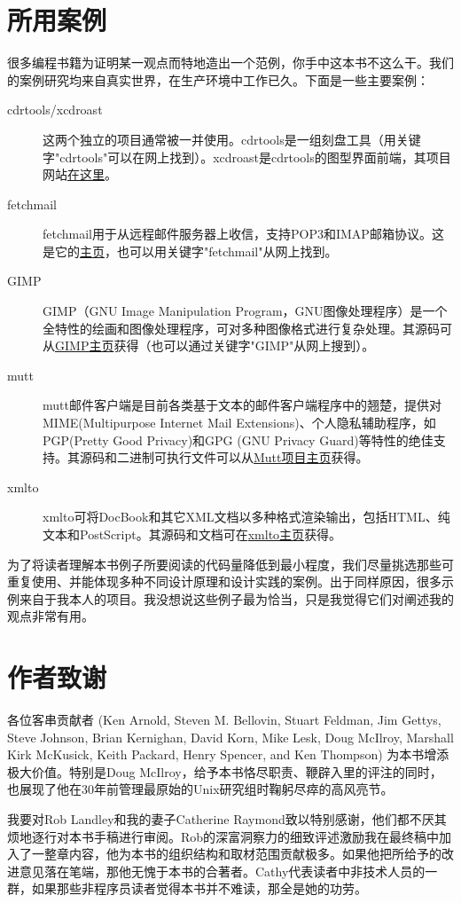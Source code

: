 \documentclass[12pt,oneside]{book}
\begin{document}
\section{所用案例}
很多编程书籍为证明某一观点而特地造出一个范例，你手中这本书不这么干。我们的案例研究均来自真实世界，在生产环境中工作已久。下面是一些主要案例：
\begin{description}
\item[cdrtools/xcdroast] 这两个独立的项目通常被一并使用。cdrtools是一组刻盘工具（用关键字"cdrtools"可以在网上找到）。xcdroast是cdrtools的图型界面前端，其项目网站\href{http://www.xcdroast.org/}{在这里}。
\item[fetchmail] fetchmail用于从远程邮件服务器上收信，支持POP3和IMAP邮箱协议。这是它的\href{http://www.catb.org/~esr/fetchmail}{主页}，也可以用关键字"fetchmail"从网上找到。
\item[GIMP] GIMP（GNU Image Manipulation Program，GNU图像处理程序）是一个全特性的绘画和图像处理程序，可对多种图像格式进行复杂处理。其源码可从\href{http://www.gimp.org/}{GIMP主页}获得（也可以通过关键字"GIMP"从网上搜到）。
\item[mutt] mutt邮件客户端是目前各类基于文本的邮件客户端程序中的翘楚，提供对MIME(Multipurpose Internet Mail Extensions)、个人隐私辅助程序，如PGP(Pretty Good Privacy)和GPG (GNU Privacy Guard)等特性的绝佳支持。其源码和二进制可执行文件可以从\href{http://www.mutt.org/}{Mutt项目主页}获得。
\item[xmlto] xmlto可将DocBook和其它XML文档以多种格式渲染输出，包括HTML、纯文本和PostScript。其源码和文档可在\href{http://cyberelk.net/tim/xmlto/}{xmlto主页}获得。
\end{description}

为了将读者理解本书例子所要阅读的代码量降低到最小程度，我们尽量挑选那些可重复使用、并能体现多种不同设计原理和设计实践的案例。出于同样原因，很多示例来自于我本人的项目。我没想说这些例子最为恰当，只是我觉得它们对阐述我的观点非常有用。

\section{作者致谢}
各位客串贡献者 (Ken Arnold, Steven M. Bellovin, Stuart Feldman, Jim Gettys, Steve Johnson, Brian Kernighan, David Korn, Mike Lesk, Doug McIlroy, Marshall Kirk McKusick, Keith Packard, Henry Spencer, and Ken Thompson) 为本书增添极大价值。特别是Doug McIlroy，给予本书恪尽职责、鞭辟入里的评注的同时，也展现了他在30年前管理最原始的Unix研究组时鞠躬尽瘁的高风亮节。

我要对Rob Landley和我的妻子Catherine Raymond致以特别感谢，他们都不厌其烦地逐行对本书手稿进行审阅。Rob的深富洞察力的细致评述激励我在最终稿中加入了一整章内容，他为本书的组织结构和取材范围贡献极多。如果他把所给予的改进意见落在笔端，那他无愧于本书的合著者。Cathy代表读者中非技术人员的一群，如果那些非程序员读者觉得本书并不难读，那全是她的功劳。
\end{document}

